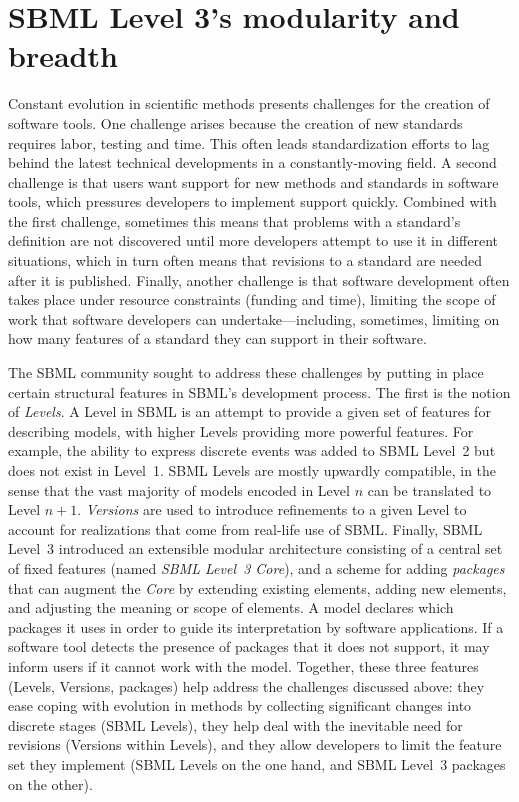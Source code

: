 \documentclass{sbml-paper}
\begin{document}
\section*{SBML Level 3's modularity and breadth}\label{sec:modularity}

Constant evolution in scientific methods presents challenges for the creation of software tools.  One challenge arises because the creation of new standards requires labor, testing and time.  This often leads standardization efforts to lag behind the latest technical developments in a constantly-moving field.  A second challenge is that users want support for new methods and standards in software tools, which pressures developers to implement support quickly.  Combined with the first challenge, sometimes this means that problems with a standard's definition are not discovered until more developers attempt to use it in different situations, which in turn often means that revisions to a standard are needed after it is published.  Finally, another challenge is that software development often takes place under resource constraints (\eg funding and time), limiting the scope of work that software developers can undertake---including, sometimes, limiting on how many features of a standard they can support in their software.

The SBML community sought to address these challenges by putting in place certain structural features in SBML's development process.  The first is the notion of \emph{Levels}.  A Level in SBML is an attempt to provide a given set of features for describing models, with higher Levels providing more powerful features.  For example, the ability to express discrete events was added to SBML Level~2 but does not exist in Level~1.  SBML Levels are mostly upwardly compatible, in the sense that the vast majority of models encoded in Level $n$ can be translated to Level $n+1$.  \emph{Versions} are used to introduce refinements to a given Level to account for realizations that come from real-life use of SBML.  Finally, SBML Level~3 introduced an extensible modular architecture consisting of a central set of fixed features (named \emph{SBML Level~3 Core}), and a scheme for adding \emph{packages} that can augment the \emph{Core} by extending existing elements, adding new elements, and adjusting the meaning or scope of elements.  A model declares which packages it uses in order to guide its interpretation by software applications.  If a software tool detects the presence of packages that it does not support, it may inform users if it cannot work with the model.  Together, these three features (Levels, Versions, packages) help address the challenges discussed above: they ease coping with evolution in methods by collecting significant changes into discrete stages (SBML Levels), they help deal with the inevitable need for revisions (Versions within Levels), and they allow developers to limit the feature set they implement (SBML Levels on the one hand, and SBML Level~3 packages on the other).
\end{document}

